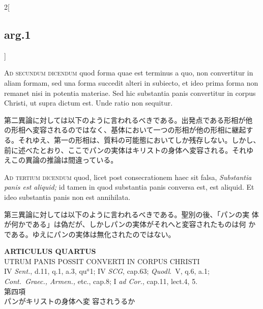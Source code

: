 \documentclass[paper=a4paper,fontsize=10pt,jafontsize=9pt,titlepage]{jlreq}
\begin{document}
\begin{paracol}{2}[\subsection{arg.1}]
\switchcolumn*[\subsection{ad.2}]

{\scshape Ad secundum dicendum} quod forma quae est terminus a quo,
non convertitur in aliam formam, sed una forma succedit alteri in
subiecto, et ideo prima forma non remanet nisi in potentia
materiae. Sed hic substantia panis convertitur in corpus Christi, ut
supra dictum est. Unde ratio non sequitur.

\switchcolumn

第二異論に対しては以下のように言われるべきである。出発点である形相が他
の形相へ変容されるのではなく、基体において一つの形相が他の形相に継起す
る。それゆえ、第一の形相は、質料の可能態においてしか残存しない。しかし、
前に述べたとおり、ここでパンの実体はキリストの身体へ変容される。それゆ
えこの異論の推論は間違っている。

\switchcolumn*[\subsection{ad.3}]

{\scshape Ad tertium dicendum} quod, licet post consecrationem haec
sit falsa, {\itshape Substantia panis est aliquid;} id tamen in quod
substantia panis conversa est, est aliquid. Et ideo substantia panis
non est annihilata.

\switchcolumn

第三異論に対しては以下のように言われるべきである。聖別の後、「パンの実
体が何かである」は偽だが、しかしパンの実体がそれへと変容されたものは何
かである。ゆえにパンの実体は無化されたのではない。

\end{paracol}
\newpage
{}
{}
\setcounter{section}{4}
\setcounter{subsection}{0}



\begin{center}
{\Large {\bfseries ARTICULUS QUARTUS}}\\ {\large UTRUM PANIS POSSIT CONVERTI
IN CORPUS CHRISTI}\\ {\footnotesize IV {\itshape Sent.}, d.11, q.1,
a.3, qu$^a$1; IV {\itshape SCG}, cap.63; {\itshape Quodl}.~V, q.6,
a.1;\\ {\itshape Cont.~Graec., Armen.,} etc., cap.8; I {\itshape ad
Cor.}, cap.11, lect.4, 5.}\\ {\Large 第四項\\パンがキリストの身体へ変
容されうるか}
\end{center}
\end{document}
